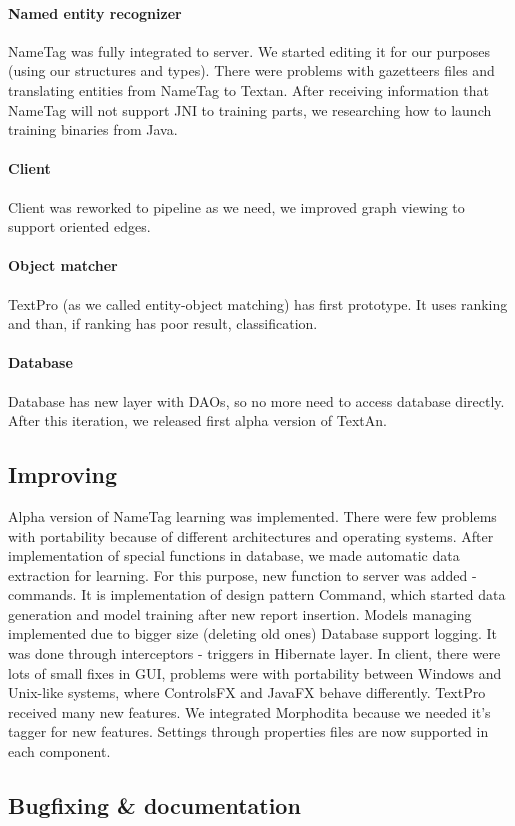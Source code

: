 \paragraph{Named entity recognizer} NameTag was fully integrated to server. We started editing it for our purposes (using our structures and types). There were problems with gazetteers files and translating entities from NameTag to Textan.
After receiving information that NameTag will not support JNI to training parts, we researching how to launch training binaries from Java.
\paragraph{Client} Client was reworked to pipeline as we need, we improved graph viewing to support oriented edges.
\paragraph{Object matcher} TextPro (as we called entity-object matching) has first prototype. It uses ranking and than, if ranking has poor result, classification.
\paragraph{Database} Database has new layer with DAOs, so no more need to access database directly.
After this iteration, we released first alpha version of TextAn.

\subsection{Improving}
Alpha version of NameTag learning was implemented. There were few problems with portability because of different architectures and operating systems. After implementation of special functions in database, we made automatic data extraction for learning. For this purpose, new function to server was added - commands. It is implementation of design pattern Command, which started data generation and model training after new report insertion. Models managing implemented due to bigger size (deleting old ones) 
Database support logging. It was done through interceptors - triggers in Hibernate layer.
In client, there were lots of small fixes in GUI, problems were with portability between Windows and Unix-like systems, where ControlsFX and JavaFX behave differently.
TextPro received many new features. We integrated Morphodita because we needed it's tagger for new features.
Settings through properties files are now supported in each component.

\subsection{Bugfixing \& documentation}
